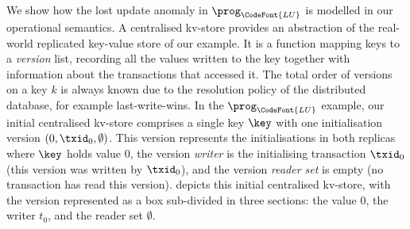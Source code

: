 We show how the lost update anomaly in
\(\prog_{\CodeFont{LU}}\) is modelled in our operational semantics.  
A centralised kv-store provides an abstraction of the real-world
replicated key-value store of our example.  It is a function mapping
keys to a {\em version} list, recording {all} the values written to the key
together with information about the transactions that
accessed it. The total order of versions on a key $k$ is always known
due to the resolution policy of the distributed database, 
for example last-write-wins. 
In the \(\prog_{\CodeFont{LU}}\) example, our initial centralised
kv-store comprises a single key \(\key\)  with  one initialisation version \((0, \txid_{0}, \emptyset)\).
This version represents the initialisations in both replicas where \(\key\) holds value \(0\), 
 the version \emph{writer} is the initialising transaction
\(\txid_0\) (this version was written by \(\txid_0\)), 
and  the version \emph{reader set} is empty (no transaction has read this version). 
 depicts this initial centralised kv-store, with the version
represented as a box sub-divided in three sections: the value \(0\),
the writer \(t_0\), and the reader set \(\emptyset\). 

